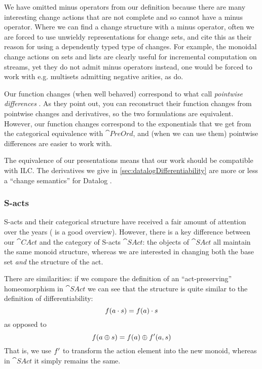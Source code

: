We have omitted minus operators from our definition because
there are many interesting change actions that are not complete and so cannot
have a minus operator. Where we can find a change structure with a minus operator, often we are
forced to use unwieldy representations for change sets, and
\citeauthor{cai2014changes} cite this as their reason for using a dependently
typed type of changes. For example, the monoidal change actions on sets and lists are clearly
useful for incremental computation on streams, yet they do not admit minus operators \textemdash{} instead, one would
be forced to work with e.g. multisets admitting negative arities, as \citeauthor{cai2014changes} do.

Our function changes (when well behaved) correspond to what \citeauthor{cai2014changes} call
\emph{pointwise differences} \autocite[see][section 2.2]{cai2014changes}. As they point out, you can reconstruct their
function changes from pointwise changes and derivatives, so the two formulations
are equivalent. However, our function changes correspond to the
exponentials that we get from the categorical equivalence with $\cat{PreOrd}$,
and (when we can use them) pointwise differences are easier to work with.

The equivalence of our presentations means that our work should be compatible
with ILC. The derivatives we give in \cref{sec:datalogDifferentiability} are more or
less a ``change semantics'' for Datalog \autocite[see][section
3.5]{cai2014changes}. 

\subsubsection{S-acts}
\label{sec:sacts}

S-acts and their categorical structure have received a fair amount of attention
over the years (\textcite{kilp2000monoids} is a good
overview). However, there is a key difference between our $\cat{CAct}$ and the category of
S-acts $\cat{SAct}$: the objects of $\cat{SAct}$ all maintain the same monoid
structure, whereas we are interested in changing both the base set \emph{and} the structure of the act.

There are similarities: if we compare the definition of an ``act-preserving''
homeomorphism in $\cat{SAct}$ \autocite[see][]{kilp2000monoids} we can see that the structure is
quite similar to the definition of differentiability:
\begin{displaymath}
  f(a \cdot s) = f(a) \cdot s
\end{displaymath}
as opposed to
\begin{displaymath}
  f(a \oplus s) = f(a) \oplus f'(a, s)
\end{displaymath}
That is, we use $f'$ to transform the action element into the new
monoid, whereas in $\cat{SAct}$ it simply remains the same.

